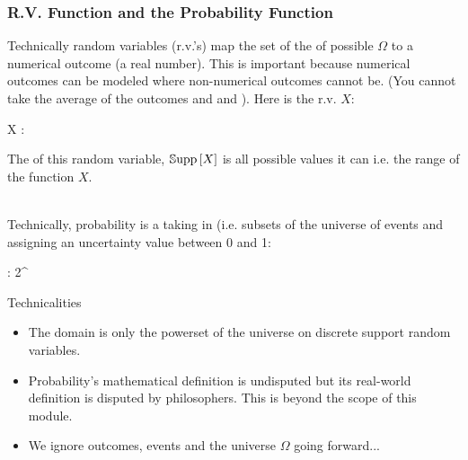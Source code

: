 \documentclass[slides]{beamer} %
\begin{document}
%
%


\begin{frame}
	\frametitle{R.V. Function and the Probability Function}

\scriptsize

Technically random variables (r.v.'s) map the set of the  of possible  $\Omega$ \pause to a numerical outcome (a real number). \pause This is important because numerical outcomes can be modeled where non-numerical outcomes cannot be. \pause (You cannot take the average of the outcomes  and  and ). \pause Here is the r.v. $X$:

\beqn
X : \Omega \rightarrow \reals
\eeqn

The  of this random variable, $\mathbb{S}\text{upp}\left[X\right]$ is all possible values it can  i.e. the range of the function $X$. \\~\\\pause

Technically, probability is a  taking in  (i.e. subsets of the universe of events and assigning an uncertainty value between 0 and 1:\pause

\beqn
{} : 2^\Omega \rightarrow \zeroonecl
\eeqn
\pause

\begin{block}{\tiny Technicalities}
\begin{itemize}
\item \tiny The domain is only the powerset of the universe on discrete support random variables.
\item \tiny Probability's mathematical definition is undisputed but its real-world definition is disputed by philosophers. This is beyond the scope of this module.
\item \tiny We ignore outcomes, events and the universe $\Omega$ going forward...
\end{itemize}
\end{block}

\end{frame}
\end{document}
